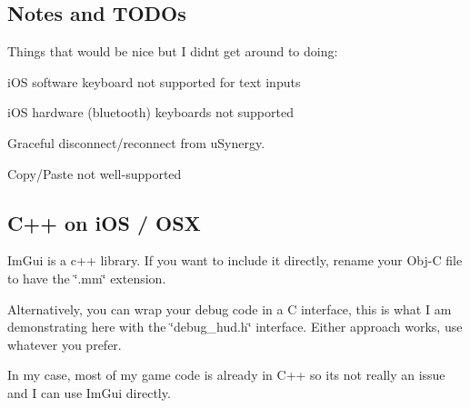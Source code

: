 \subsection*{Notes and T\+O\+D\+Os}

Things that would be nice but I didn\textquotesingle{}t get around to doing\+:


\begin{DoxyItemize}
\item i\+OS software keyboard not supported for text inputs
\item i\+OS hardware (bluetooth) keyboards not supported
\item Graceful disconnect/reconnect from u\+Synergy.
\item Copy/\+Paste not well-\/supported
\end{DoxyItemize}

\subsection*{C++ on i\+OS / O\+SX}

Im\+Gui is a c++ library. If you want to include it directly, rename your Obj-\/C file to have the \char`\"{}.\+mm\char`\"{} extension.

Alternatively, you can wrap your debug code in a C interface, this is what I am demonstrating here with the \char`\"{}debug\+\_\+hud.\+h\char`\"{} interface. Either approach works, use whatever you prefer.

In my case, most of my game code is already in C++ so it\textquotesingle{}s not really an issue and I can use Im\+Gui directly. 